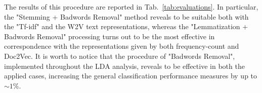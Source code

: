 \documentclass[10pt]{article}
\begin{document}
The results of this procedure are reported in Tab.~\ref{tab:evaluations}. In particular, the "Stemming + Badwords Removal" method reveals to be suitable both with the "Tf-idf" and the W2V text representations, whereas the "Lemmatization + Badwords Removal" processing turns out to be the most effective in correspondence with the representations given by both frequency-count and Doc2Vec.
It is worth to notice that the procedure of "Badwords Removal", implemented throughout the LDA analysis, reveals to be effective in both the applied cases, increasing the general classification performance measures by up to $\sim 1\%$.

\begin{table}[]
\newline
\vspace{1mm}
\newline
{}
\end{table}
\end{document}

